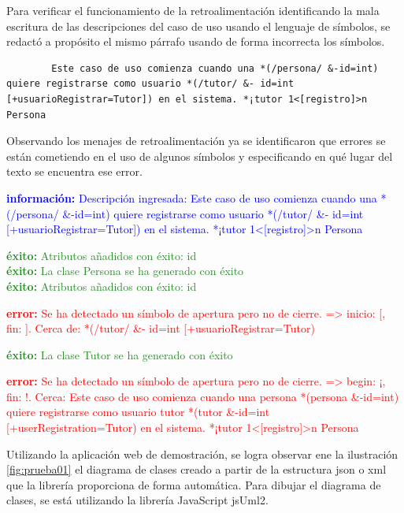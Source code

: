 \begin{itemize}
	Para verificar el funcionamiento de la retroalimentación identificando la mala escritura de las descripciones del caso de uso usando el lenguaje de símbolos, se redactó a propósito el mismo párrafo usando de forma incorrecta los símbolos.
	
	\begin{lstlisting}
		Este caso de uso comienza cuando una *(/persona/ &-id=int) quiere registrarse como usuario *(/tutor/ &- id=int [+usuarioRegistrar=Tutor]) en el sistema. *¡tutor 1<[registro]>n Persona \end{lstlisting} 
	
	Observando los menajes de retroalimentación ya se identificaron que errores se están cometiendo en el uso de algunos símbolos y especificando en qué lugar del texto se encuentra ese error.
	
	\textcolor{blue}{\textbf{información:} Descripción ingresada: Este caso de uso comienza cuando una *(/persona/ \&-id=int) quiere registrarse como usuario *(/tutor/ \&- id=int [+usuarioRegistrar=Tutor]) en el sistema. *¡tutor 1<[registro]>n Persona}
	
	\textcolor{ForestGreen}{
	\textbf{éxito:} Atributos añadidos con éxito: id \\
	\textbf{éxito:} La clase Persona se ha generado con éxito \\
	\textbf{éxito:} Atributos añadidos con éxito: id}

	\textcolor{Red}{
	\textbf{error:} Se ha detectado un símbolo de apertura pero no de cierre. => inicio: [, fin: ]. Cerca de: *(/tutor/ \&- id=int [+usuarioRegistrar=Tutor)}

	\textcolor{ForestGreen}{\textbf{éxito:} La clase Tutor se ha generado con éxito }
	
	\textcolor{Red}{
	\textbf{error:}  Se ha detectado un símbolo de apertura pero no de cierre. => begin: ¡, fin: !. Cerca: Este caso de uso comienza cuando una persona *(persona \&-id=int) quiere registrarse como usuario tutor *(tutor \&-id=int [+userRegistration=Tutor) en el sistema. *¡tutor 1<[registro]>n Persona}

	Utilizando la aplicación web de demostración, se logra observar ene la ilustración \ref{fig:prueba01} el diagrama de clases creado a partir de la estructura json o xml que la librería proporciona de forma automática. Para dibujar el diagrama de clases, se está utilizando la librería JavaScript jsUml2. 
	

\end{itemize}
